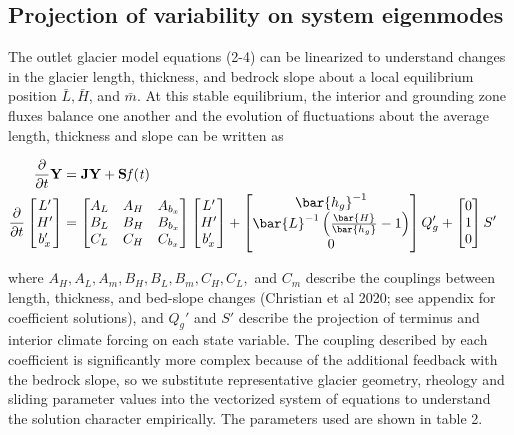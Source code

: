 \documentclass[tc, manuscript]{copernicus}
\begin{document}
\subsection{Projection of variability on system eigenmodes}
The outlet glacier model equations (2-4)  can be linearized to understand changes in the glacier length, thickness, and bedrock slope about a local equilibrium position $\bar{L}, \bar{H}$, and $\bar{m}$. At this stable equilibrium, the interior and grounding zone fluxes balance one another and the evolution of fluctuations about the average length, thickness and slope can be written as

\begin{align}
\frac{\partial}{\partial t}\bf{Y} &= \bf{JY}+\bf{S} \it{f(t)}& \\
\frac{\partial}{\partial t}
 \begin{bmatrix} L' \\ H' \\ b_x' \end{bmatrix}
 &=
  \begin{bmatrix}
   A_L & A_H & A_{b_x}  \\
   B_L & B_H& B_{b_x} \\
   C_L & C_H & C_{b_x}
   \end{bmatrix}
    \begin{bmatrix} L' \\ H' \\ b_x' \end{bmatrix}
    +
    \begin{bmatrix} \bar{h_g}^{-1} \\ \bar{L}^{-1}\left(\frac{\bar{H}}{\bar{h_g}}-1\right) \\ 0 \end{bmatrix} Q_g'
    + 
    \begin{bmatrix} 0 \\ 1 \\ 0 \end{bmatrix} S'&
\end{align}

where $A_H, A_L, A_m, B_H, B_L, B_m, C_H, C_L,$ and $C_m$ describe the couplings between length, thickness, and bed-slope changes (Christian et al 2020; see appendix for coefficient solutions), and $Q_g'$ and $S'$ describe the projection of terminus and interior climate forcing on each state variable. The coupling described by each coefficient is significantly more complex because of the additional feedback with the bedrock slope, so we substitute representative glacier geometry, rheology and sliding parameter values into the vectorized system of equations to understand the solution character empirically. The parameters used are shown in table 2.
\end{document}
